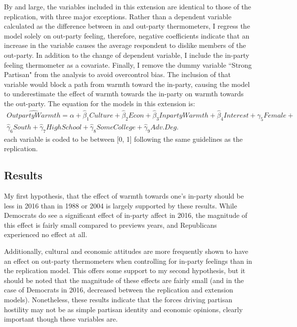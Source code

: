 \documentclass[12pt]{article}
\begin{document}
By and large, the variables included in this extension are identical to those of the replication, with three major exceptions. Rather than a dependent variable calculated as the difference between in and out-party thermometers, I regress the model solely on out-party feeling, therefore, negative coefficients indicate that an increase in the variable causes the average respondent to dislike members of the out-party. In addition to the change of dependent variable, I include the in-party feeling thermometer as a covariate. Finally, I remove the dummy variable ``Strong Partisan" from the analysis to avoid overcontrol bias. The inclusion of that variable would block a path from warmth toward the in-party, causing the model to underestimate the effect of warmth towards the in-party on warmth towards the out-party. The equation for the models in this extension is:
\begin{equation}
\begin{split}
\hat{\mathit{Outparty Warmth}} = \alpha + \hat{\beta}_1{\mathit{Culture}} + \hat{\beta}_2\mathit{Econ} + \hat{\beta}_3\mathit{Inparty Warmth} +  \hat{\beta}_4\mathit{Interest} +  \gamma_5\mathit{Female} + \\ \hat{\gamma}_6\mathit{South} + \hat{\gamma}_7\mathit{High School} + \hat{\gamma}_8\mathit{Some College} + \hat{\gamma}_9\mathit{Adv. Deg.}
\end{split}
\end{equation}
each variable is coded to be between [0, 1] following the same guidelines as the replication.
\subsection{Results}
My first hypothesis, that the effect of warmth towards one's in-party should be less in 2016 than in 1988 or 2004 is largely supported by these results. While Democrats do see a significant effect of in-party affect in 2016, the magnitude of this effect is fairly small compared to previews years, and Republicans experienced no effect at all.

Additionally, cultural and economic attitudes are more frequently shown to have an effect on out-party thermometers when controlling for in-party feelings than in the replication model. This offers some support to my second hypothesis, but it should be noted that the magnitude of these effects are fairly small (and in the case of Democrats in 2016, decreased between the replication and extension models). Nonetheless, these results indicate that the forces
\noindent driving partisan hostility may not be as simple partisan identity and economic opinions, clearly important though these variables are.
\end{document}
